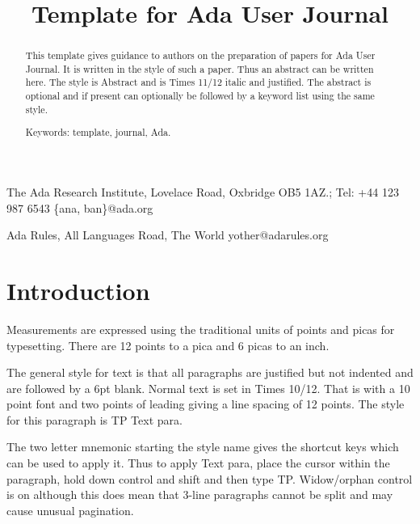 \documentclass{AUJarticle}
\begin{document}
\title{Template for Ada User Journal}

{The Ada Research Institute, Lovelace Road, 
  Oxbridge OB5 1AZ.; Tel: +44 123 987 6543} 
  {\{ana, ban\}@ada.org}

{Ada Rules, All Languages Road, 
  The World} 
  {yother@adarules.org}



\thispagestyle{plain}

\maketitle

\begin{abstract}

This template gives guidance to authors on the preparation of papers for Ada User Journal. It is
written in the style of such a paper. Thus an abstract can be written here. The style is
Abstract and is Times 11/12 italic and justified. The abstract is optional and if present can
optionally be followed by a keyword list using the same style.

Keywords: template, journal, Ada.

\end{abstract}

\section{Introduction}

Measurements are expressed using the traditional units of points and picas for typesetting.
There are 12 points to a pica and 6 picas to an inch.

The general style for text is that all paragraphs are justified but not indented and are
followed by a 6pt blank. Normal text is set in Times 10/12. That is with a 10 point font and two
points of leading giving a line spacing of 12 points. The style for this paragraph is TP Text
para.

The two letter mnemonic starting the style name gives the shortcut keys which can be used to
apply it. Thus to apply Text para, place the cursor within the paragraph, hold down control and
shift and then type TP. Widow/orphan control is on although this does mean that 3-line
paragraphs cannot be split and may cause unusual pagination.
\end{document}
